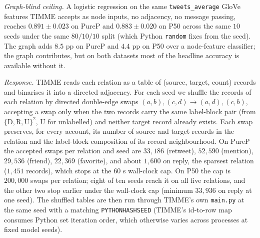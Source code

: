 \documentclass[letterpaper]{article} %
\begin{document}
\emph{Graph-blind ceiling.} A logistic regression on the same
\texttt{tweets\_average} GloVe features TIMME accepts as node
inputs, no adjacency, no message passing, reaches
$0.891 \pm 0.023$ on PureP and $0.883 \pm 0.020$ on P50 across
the same $10$ seeds under the same $80/10/10$ split (which
Python \texttt{random} fixes from the seed). The graph adds
$8.5$ pp on PureP and $4.4$ pp on P50 over a node-feature
classifier; the graph contributes, but on both datasets most
of the headline accuracy is available without it.

\emph{Response.} TIMME reads each relation as a table of
(source, target, count) records and binarises it into a
directed adjacency. For each seed we shuffle the records of
each relation by directed double-edge swaps
$(a, b), (c, d) \to (a, d), (c, b)$, accepting a swap only
when the two records carry the same label-block pair (from
$\{\mathrm{D}, \mathrm{R}, \mathrm{U}\}^2$, U for unlabelled)
and neither target record already exists. Each swap preserves,
for every account, its number of source and target records in
the relation and the label-block composition of its record
neighbourhood. On PureP the accepted swaps per relation and
seed are $33{,}186$ (retweet), $52{,}590$ (mention),
$29{,}536$ (friend), $22{,}369$ (favorite), and about
$1{,}600$ on reply, the sparsest relation ($1{,}451$ records),
which stops at the $60$ s wall-clock cap. On P50 the cap is
$200{,}000$ swaps per relation; eight of ten seeds reach it on
all five relations, and the other two stop earlier under the
wall-clock cap (minimum $33{,}936$ on reply at one seed). The
shuffled tables are then run through TIMME's own
\texttt{main.py} at the same seed with a matching
\texttt{PYTHONHASHSEED} (TIMME's id-to-row map consumes Python
set iteration order, which otherwise varies across processes
at fixed model seeds).
\end{document}
